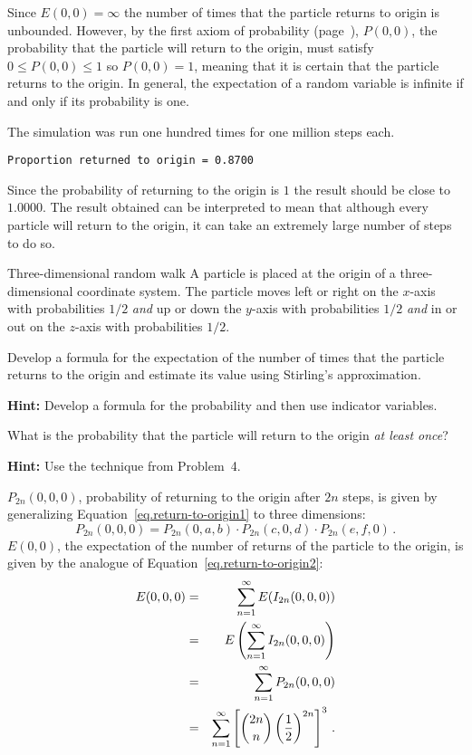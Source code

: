 Since $E(0,0)=\infty$ the number of times that the particle returns to origin is unbounded. However, by the first axiom of probability (page~\pageref{p.first-axiom}), $P(0,0)$, the probability that the particle will return to the origin, must satisfy $0\leq P(0,0) \leq 1$ so $P(0,0)=1$, meaning that it is certain that the particle returns to the origin. In general, the expectation of a random variable is infinite if and only if its probability is one.

\sml{}

The simulation was run one hundred times for one million steps each.
\begin{verbatim}
Proportion returned to origin = 0.8700
\end{verbatim}
Since the probability of returning to the origin is $1$ the result should be close to $1.0000$. The result obtained can be interpreted to mean that although every particle will return to the origin, it can take an extremely large number of steps to do so.


\begin{prob}{Three-dimensional random walk}
A particle is placed at the origin of a three-dimensional coordinate system. The particle moves left or right on the $x$-axis with probabilities $1/2$ \emph{and} up or down the $y$-axis with probabilities $1/2$ \emph{and} in or out on the $z$-axis with probabilities $1/2$.

 Develop a formula for the expectation of the number of times that the particle returns to the origin and estimate its value using Stirling's approximation.

\textbf{Hint:} Develop a formula for the probability and then use indicator variables.

 What is the probability that the particle will return to the origin \emph{at least once}?

\textbf{Hint:} Use the technique from Problem~4.
\end{prob}

\newpage

\solution{}

 $P_{2n}(0,0,0)$, probability of returning to the origin after $2n$ steps, is given by generalizing Equation~\ref{eq.return-to-origin1} to three dimensions:
\begin{equation}\label{eq.rw-multiply}
P_{2n}(0,0,0) =
P_{2n}(0,a,b)\cdot P_{2n}(c,0,d)\cdot P_{2n}(e,f,0)\,.
\end{equation}
$E(0,0)$, the expectation of the number of returns of the particle to the origin, is given by the analogue of Equation~\ref{eq.return-to-origin2}:
\begin{eqnarray*}
E(0,0,0) &=&
\sum_{n=1}^{\infty}E(I_{2n}(0,0,0))\\
& =&E\left(\sum_{n=1}^{\infty}I_{2n}(0,0,0)\right) \\
&=&\sum_{n=1}^{\infty}P_{2n}(0,0,0)\\
& =&\sum_{n=1}^{\infty}\left[\displaystyle{2n \choose n}\left(\displaystyle\frac{1}{2}\right)^{2n}\right]^3\,.
\end{eqnarray*}


